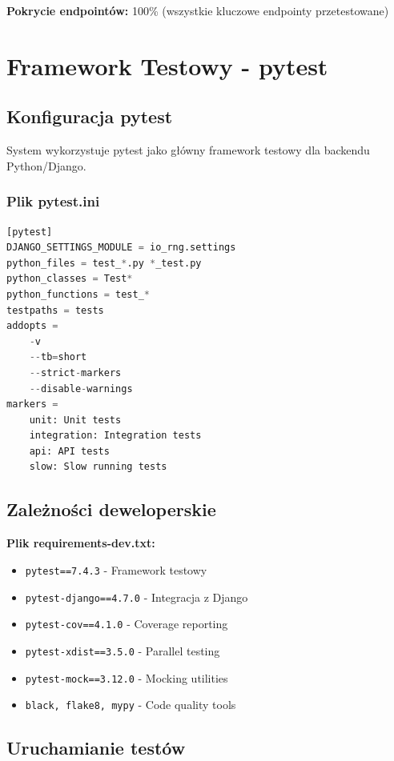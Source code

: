 \documentclass[12pt,a4paper]{article}
\begin{document}
\textbf{Pokrycie endpointów:} 100\% (wszystkie kluczowe endpointy przetestowane)

\newpage

\section{Framework Testowy - pytest}

\subsection{Konfiguracja pytest}

System wykorzystuje pytest jako główny framework testowy dla backendu Python/Django.

\subsubsection{Plik pytest.ini}

\begin{lstlisting}[language=Python, caption=pytest.ini - Konfiguracja]
[pytest]
DJANGO_SETTINGS_MODULE = io_rng.settings
python_files = test_*.py *_test.py
python_classes = Test*
python_functions = test_*
testpaths = tests
addopts = 
    -v
    --tb=short
    --strict-markers
    --disable-warnings
markers =
    unit: Unit tests
    integration: Integration tests
    api: API tests
    slow: Slow running tests
\end{lstlisting}

\subsection{Zależności deweloperskie}

\textbf{Plik requirements-dev.txt:}
\begin{itemize}
    \item \texttt{pytest==7.4.3} - Framework testowy
    \item \texttt{pytest-django==4.7.0} - Integracja z Django
    \item \texttt{pytest-cov==4.1.0} - Coverage reporting
    \item \texttt{pytest-xdist==3.5.0} - Parallel testing
    \item \texttt{pytest-mock==3.12.0} - Mocking utilities
    \item \texttt{black, flake8, mypy} - Code quality tools
\end{itemize}

\subsection{Uruchamianie testów}
\end{document}
